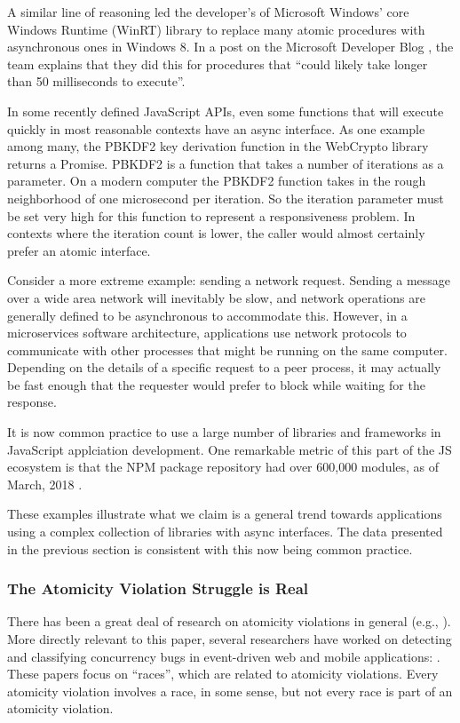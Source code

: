 \documentclass[acmsmall,anonymous,review]{acmart}\settopmatter{printfolios=true,printccs=false,printacmref=false}
\begin{document}
A similar line of reasoning led the developer's of Microsoft Windows' core Windows Runtime (WinRT) library to replace many atomic procedures with asynchronous ones in Windows 8.
In a post on the Microsoft Developer Blog \cite{Windows8Team2012}, the team explains that they did this for procedures that ``could likely take longer than 50 milliseconds to execute''.

In some recently defined JavaScript APIs, even some functions that will execute quickly in most reasonable contexts have an async interface.
As one example among many, the PBKDF2 key derivation function in the WebCrypto library returns a Promise.
PBKDF2 is a function that takes a number of iterations as a parameter.
On a modern computer the PBKDF2 function takes in the rough neighborhood of one microsecond per iteration.
So the iteration parameter must be set very high for this function to represent a responsiveness problem.
In contexts where the iteration count is lower, the caller would almost certainly prefer an atomic interface.

Consider a more extreme example: sending a network request.
Sending a message over a wide area network will inevitably be slow, and network operations are generally defined to be asynchronous to accommodate this.
However, in a microservices software architecture, applications use network protocols to communicate with other processes that might be running on the same computer.
Depending on the details of a specific request to a peer process, it may actually be fast enough that the requester would prefer to block while waiting for the response.

It is now common practice to use a large number of libraries and frameworks in JavaScript applciation development.
One remarkable metric of this part of the JS ecosystem is that the NPM package repository had over 600,000 modules, as of March, 2018 \cite{ModuleCounts}.

These examples illustrate what we claim is a general trend towards applications using a complex collection of libraries with async interfaces.
The data presented in the previous section is consistent with this now being common practice.


\subsubsection{The Atomicity Violation Struggle is Real}

There has been a great deal of research on atomicity violations in general (e.g., \cite{Lu2008}).
More directly relevant to this paper, several researchers have worked on detecting and classifying concurrency bugs in event-driven web and mobile applications: \cite{Petrov2012, Hsiao2014, Mutlu2015, Zhang2017}.
These papers focus on ``races'', which are related to atomicity violations.
Every atomicity violation involves a race, in some sense, but not every race is part of an atomicity violation.
\end{document}
